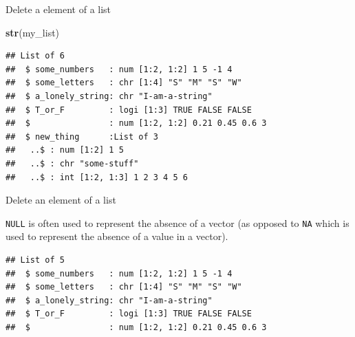 \documentclass[ignorenonframetext,]{beamer}
\newenvironment{Shaded}{\begin{snugshade}}{\end{snugshade}}
\newcommand{\CommentTok}[1]{\textcolor[rgb]{0.56,0.35,0.01}{\textit{#1}}}
\newcommand{\KeywordTok}[1]{\textcolor[rgb]{0.13,0.29,0.53}{\textbf{#1}}}
\newcommand{\NormalTok}[1]{#1}
\newcommand{\OperatorTok}[1]{\textcolor[rgb]{0.81,0.36,0.00}{\textbf{#1}}}
\newcommand{\OtherTok}[1]{\textcolor[rgb]{0.56,0.35,0.01}{#1}}
\newcommand{\StringTok}[1]{\textcolor[rgb]{0.31,0.60,0.02}{#1}}
\begin{document}
\begin{frame}[fragile]{Delete a element of a list}
\protect\hypertarget{delete-a-element-of-a-list}{}

\begin{Shaded}
\begin{Highlighting}[]
\KeywordTok{str}\NormalTok{(my_list)}
\end{Highlighting}
\end{Shaded}

\begin{verbatim}
## List of 6
##  $ some_numbers   : num [1:2, 1:2] 1 5 -1 4
##  $ some_letters   : chr [1:4] "S" "M" "S" "W"
##  $ a_lonely_string: chr "I-am-a-string"
##  $ T_or_F         : logi [1:3] TRUE FALSE FALSE
##  $                : num [1:2, 1:2] 0.21 0.45 0.6 3
##  $ new_thing      :List of 3
##   ..$ : num [1:2] 1 5
##   ..$ : chr "some-stuff"
##   ..$ : int [1:2, 1:3] 1 2 3 4 5 6
\end{verbatim}

\end{frame}

\begin{frame}[fragile]{Delete an element of a list}
\protect\hypertarget{delete-an-element-of-a-list}{}

\texttt{NULL} is often used to represent the absence of a vector (as
opposed to \texttt{NA} which is used to represent the absence of a value
in a vector).

\begin{Shaded}
\end{Shaded}

\begin{verbatim}
## List of 5
##  $ some_numbers   : num [1:2, 1:2] 1 5 -1 4
##  $ some_letters   : chr [1:4] "S" "M" "S" "W"
##  $ a_lonely_string: chr "I-am-a-string"
##  $ T_or_F         : logi [1:3] TRUE FALSE FALSE
##  $                : num [1:2, 1:2] 0.21 0.45 0.6 3
\end{verbatim}

\end{frame}
\end{document}
